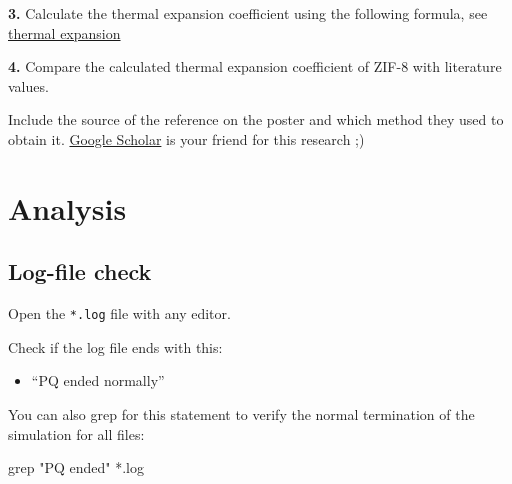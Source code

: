 \documentclass[
  letterpaper,
  DIV=11,
  numbers=noendperiod]{scrreprt}
\newenvironment{Shaded}{\begin{snugshade}}{\end{snugshade}}
\newcommand{\NormalTok}[1]{\textcolor[rgb]{0.00,0.23,0.31}{#1}}
\providecommand{\tightlist}{%
  \setlength{\itemsep}{0pt}\setlength{\parskip}{0pt}}\usepackage{longtable,booktabs,array}
\begin{document}
\textbf{3.} Calculate the thermal expansion coefficient using the
following formula, see
\protect\hyperlink{linear--volumetric-thermal-expansion-coefficient}{thermal
expansion}

\textbf{4.} Compare the calculated thermal expansion coefficient of
ZIF-8 with literature values.

\begin{tcolorbox}[enhanced jigsaw, title=\textcolor{quarto-callout-note-color}{\faInfo}\hspace{0.5em}{Note}, colbacktitle=quarto-callout-note-color!10!white, bottomtitle=1mm, breakable, colframe=quarto-callout-note-color-frame, toprule=.15mm, opacitybacktitle=0.6, bottomrule=.15mm, titlerule=0mm, arc=.35mm, rightrule=.15mm, toptitle=1mm, coltitle=black, left=2mm, opacityback=0, colback=white, leftrule=.75mm]

Include the source of the reference on the poster and which method they
used to obtain it. \href{https://scholar.google.com/}{Google Scholar} is
your friend for this research ;)

\end{tcolorbox}

\hypertarget{analysis-1}{%
\chapter{Analysis}\label{analysis-1}}

\hypertarget{log-file-check}{%
\section{Log-file check}\label{log-file-check}}

Open the \texttt{*.log} file with any editor.

Check if the log file ends with this:

\begin{itemize}
\tightlist
\item[$\square$]
  ``PQ ended normally''
\end{itemize}

You can also grep for this statement to verify the normal termination of
the simulation for all files:

\begin{Shaded}
\begin{Highlighting}[]
\NormalTok{grep "PQ ended" *.log}
\end{Highlighting}
\end{Shaded}
\end{document}
